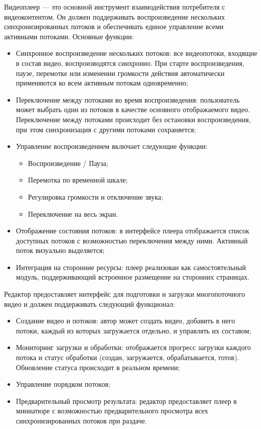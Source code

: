 	Видеоплеер — это основной инструмент взаимодействия потребителя с видеоконтентом. Он должен поддерживать воспроизведение нескольких синхронизированных потоков и обеспечивать единое управление всеми активными потоками. Основные функции:
	\begin{itemize}[label=$\bullet$]
		\item Синхронное воспроизведение нескольких потоков: все видеопотоки, входящие в состав видео, воспроизводятся синхронно. При старте воспроизведения, паузе, перемотке или изменении громкости действия автоматически применяются ко всем активным потокам одновременно;
		\item Переключение между потоками во время воспроизведения: пользователь может выбрать один из потоков в качестве основного отображаемого видео. Переключение между потоками происходит без остановки воспроизведения, при этом синхронизация с другими потоками сохраняется;
		\item Управление воспроизведением включает следующие функции:
		\begin{itemize}[label=$\circ$]
			\item Воспроизведение / Пауза;
			\item Перемотка по временной шкале;
			\item Регулировка громкости и отключение звука;
			\item Переключение на весь экран.
		\end{itemize}
		\item Отображение состояния потоков: в интерфейсе плеера отображается список доступных потоков с возможностью переключения между ними. Активный поток визуально выделяется;
		\item Интеграция на сторонние ресурсы: плеер реализован как самостоятельный модуль, поддерживающий встроенное размещение на сторонних страницах.
	\end{itemize}

	Редактор предоставляет интерфейс для подготовки и загрузки многопоточного видео и должен поддерживать следующий функционал:
	\begin{itemize}[label=$\bullet$]
		\item Создание видео и потоков: автор может создать видео, добавить в него потоки, каждый из которых загружается отдельно, и управлять их составом;
		\item Мониторинг загрузки и обработки: отображается прогресс загрузки каждого потока и статус обработки (создан, загружается, обрабатывается, готов). Обновление статуса происходит в реальном времени;
		\item Управление порядком потоков;
		\item Предварительный просмотр результата: редактор предоставляет плеер в миниатюре с возможностью предварительного просмотра всех синхронизированных потоков при раздаче.
	\end{itemize}

